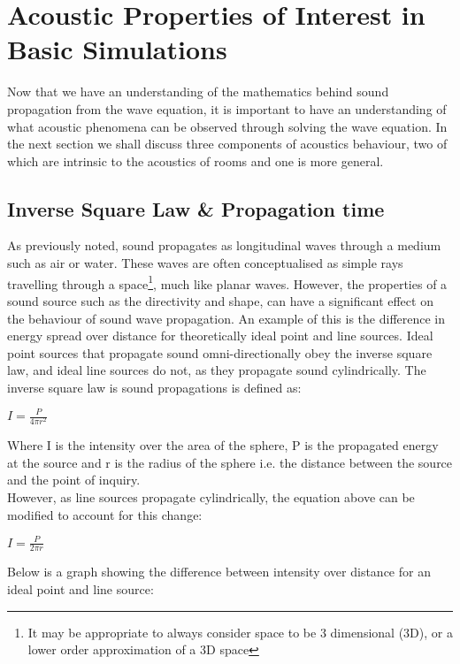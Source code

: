 \section{Acoustic Properties of Interest in Basic Simulations}
Now that we have an understanding of the mathematics behind sound propagation from the wave equation, it is important to have an understanding of what acoustic phenomena can be observed through solving the wave equation. In the next section we shall discuss three components of acoustics behaviour, two of which are intrinsic to the acoustics of rooms and one is more general.\\

\subsection{Inverse Square Law \& Propagation time}
As previously noted, sound propagates as longitudinal waves through a medium such as air or water. These waves are often conceptualised as simple rays travelling through a space\footnote{It may be appropriate to always consider space to be 3 dimensional (3D), or a lower order approximation of a 3D space}, much like planar waves. However, the properties of a sound source such as the directivity and shape, can have a significant effect on the behaviour of sound wave propagation. An example of this is the difference in energy spread over distance for theoretically ideal point and line sources. Ideal point sources that propagate sound omni-directionally obey the inverse square law, and ideal line sources do not, as they propagate sound cylindrically. The inverse square law is sound propagations is defined as:\\
\begin{center}
$I = \frac{P}{4 \pi r^2}$\\
\end{center}
Where I is the intensity over the area of the sphere, P is the propagated energy at the source and r is the radius of the sphere i.e. the distance between the source and the point of inquiry.\\



However, as line sources propagate cylindrically, the equation above can be modified to account for this change:\\
\begin{center}
$I = \frac{P}{2 \pi r}$\\
\end{center}
Below is a graph showing the difference between intensity over distance for an ideal point and line source:\\

